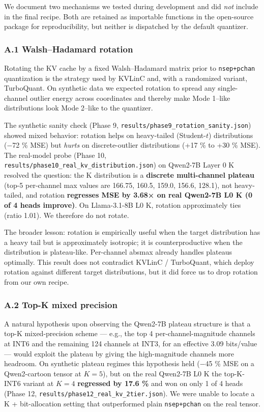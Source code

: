 \documentclass[
]{article}
\begin{document}
We document two mechanisms we tested during development and did
\emph{not} include in the final recipe. Both are retained as importable
functions in the open-source package for reproducibility, but neither is
dispatched by the default quantizer.

\subsubsection{A.1 Walsh--Hadamard
rotation}\label{a.1-walshhadamard-rotation}

Rotating the KV cache by a fixed Walsh--Hadamard matrix prior to
\texttt{nsep+pchan} quantization is the strategy used by KVLinC and,
with a randomized variant, TurboQuant. On synthetic data we expected
rotation to spread any single-channel outlier energy across coordinates
and thereby make Mode 1--like distributions look Mode 2--like to the
quantizer.

The synthetic sanity check (Phase 9,
\texttt{results/phase9\_rotation\_sanity.json}) showed mixed behavior:
rotation helps on heavy-tailed (Student-\(t\)) distributions (−72 \%
MSE) but \emph{hurts} on discrete-outlier distributions (+17 \% to +30
\% MSE). The real-model probe (Phase 10,
\texttt{results/phase10\_real\_kv\_distribution.json}) on Qwen2-7B Layer
0 K resolved the question: the K distribution is a \textbf{discrete
multi-channel plateau} (top-5 per-channel max values are 166.75, 160.5,
159.0, 156.6, 128.1), not heavy-tailed, and rotation \textbf{regresses
MSE by 3.68× on real Qwen2-7B L0 K (0 of 4 heads improve)}. On
Llama-3.1-8B L0 K, rotation approximately ties (ratio 1.01). We
therefore do not rotate.

The broader lesson: rotation is empirically useful when the target
distribution has a heavy tail but is approximately isotropic; it is
counterproductive when the distribution is plateau-like. Per-channel
absmax already handles plateaus optimally. This result does not
contradict KVLinC / TurboQuant, which deploy rotation against different
target distributions, but it did force us to drop rotation from our own
recipe.

\subsubsection{A.2 Top-K mixed
precision}\label{a.2-top-k-mixed-precision}

A natural hypothesis upon observing the Qwen2-7B plateau structure is
that a top-K mixed-precision scheme --- e.g., the top 4
per-channel-magnitude channels at INT6 and the remaining 124 channels at
INT3, for an effective 3.09 bits/value --- would exploit the plateau by
giving the high-magnitude channels more headroom. On synthetic plateau
regimes this hypothesis held (−45 \% MSE on a Qwen2-cartoon tensor at
\(K = 5\)), but on the real Qwen2-7B L0 K the top-K-INT6 variant at
\(K = 4\) \textbf{regressed by 17.6 \%} and won on only 1 of 4 heads
(Phase 12, \texttt{results/phase12\_real\_kv\_2tier.json}). We were
unable to locate a K + bit-allocation setting that outperformed plain
\texttt{nsep+pchan} on the real tensor.
\end{document}
